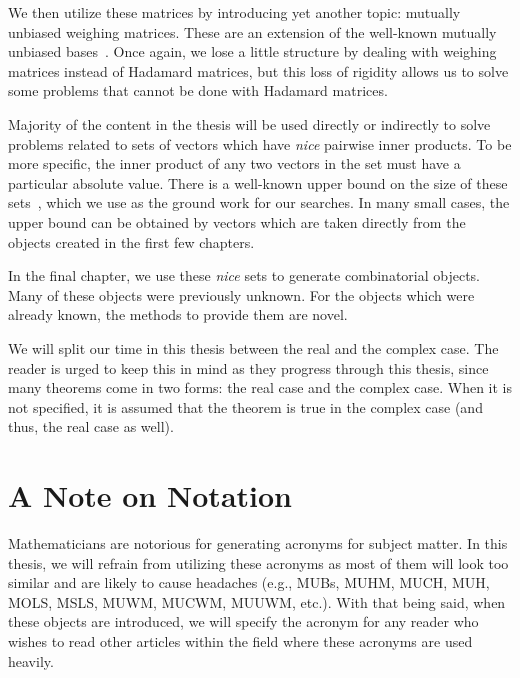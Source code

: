 We then utilize these matrices by introducing yet another topic: mutually unbiased weighing matrices. These are an extension of the well-known mutually unbiased bases~\cite{durt-muhm}. Once again, we lose a little structure by dealing with weighing matrices instead of Hadamard matrices, but this loss of rigidity allows us to solve some problems that cannot be done with Hadamard matrices.

Majority of the content in the thesis will be used directly or indirectly to solve problems related to sets of vectors which have {\it nice} pairwise inner products. To be more specific, the inner product of any two vectors in the set must have a particular absolute value. There is a well-known upper bound on the size of these sets~\cite{calderbank97}, which we use as the ground work for our searches. In many small cases, the upper bound can be obtained by vectors which are taken directly from the objects created in the first few chapters.

In the final chapter, we use these {\it nice} sets to generate combinatorial objects. Many of these objects were previously unknown. For the objects which were already known, the methods to provide them are novel.

We will split our time in this thesis between the real and the complex case. The reader is urged to keep this in mind as they progress through this thesis, since many theorems come in two forms: the real case and the complex case. When it is not specified, it is assumed that the theorem is true in the complex case (and thus, the real case as well).

\section[A Note on Notation]{A Note on Notation}
\label{sec:notation}

Mathematicians are notorious for generating acronyms for subject matter. In this thesis, we will refrain from utilizing these acronyms as most of them will look too similar and are likely to cause headaches (e.g., MUBs, MUHM, MUCH, MUH, MOLS, MSLS, MUWM, MUCWM, MUUWM, etc.). With that being said, when these objects are introduced, we will specify the acronym for any reader who wishes to read other articles within the field where these acronyms are used heavily.

